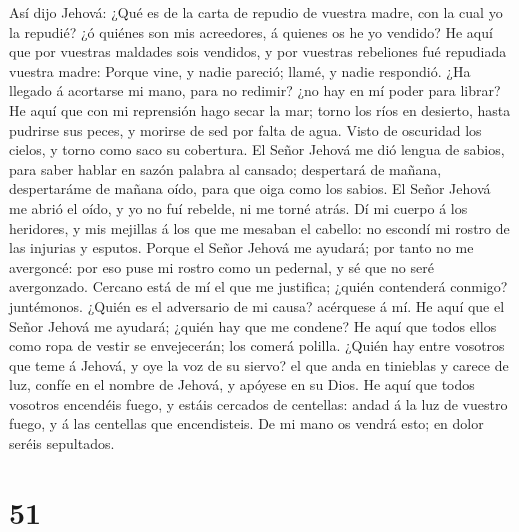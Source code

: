  Así dijo Jehová: ¿Qué es de la carta de repudio de vuestra
madre, con la cual yo la repudié? ¿ó quiénes son mis acreedores, á
quienes os he yo vendido? He aquí que por vuestras maldades sois
vendidos, y por vuestras rebeliones fué repudiada vuestra madre:
 Porque vine, y nadie pareció; llamé, y nadie respondió. ¿Ha
llegado á acortarse mi mano, para no redimir? ¿no hay en mí poder para
librar? He aquí que con mi reprensión hago secar la mar; torno los ríos
en desierto, hasta pudrirse sus peces, y morirse de sed por falta de
agua.  Visto de oscuridad los cielos, y torno como saco su
cobertura.  El Señor Jehová me dió lengua de sabios, para
saber hablar en sazón palabra al cansado; despertará de mañana,
despertaráme de mañana oído, para que oiga como los sabios. 
El Señor Jehová me abrió el oído, y yo no fuí rebelde, ni me torné
atrás.  Dí mi cuerpo á los heridores, y mis mejillas á los
que me mesaban el cabello: no escondí mi rostro de las injurias y
esputos.  Porque el Señor Jehová me ayudará; por tanto no me
avergoncé: por eso puse mi rostro como un pedernal, y sé que no seré
avergonzado.  Cercano está de mí el que me justifica; ¿quién
contenderá conmigo? juntémonos. ¿Quién es el adversario de mi causa?
acérquese á mí.  He aquí que el Señor Jehová me ayudará;
¿quién hay que me condene? He aquí que todos ellos como ropa de vestir
se envejecerán; los comerá polilla.  ¿Quién hay entre
vosotros que teme á Jehová, y oye la voz de su siervo? el que anda en
tinieblas y carece de luz, confíe en el nombre de Jehová, y apóyese en
su Dios.  He aquí que todos vosotros encendéis fuego, y
estáis cercados de centellas: andad á la luz de vuestro fuego, y á las
centellas que encendisteis. De mi mano os vendrá esto; en dolor seréis
sepultados.

\hypertarget{section-50}{%
\section{51}\label{section-50}}

